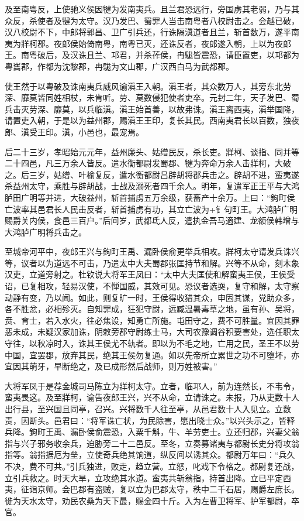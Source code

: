 \documentclass[12pt,UTF8]{ctexbook}
\begin{document}
及至南粤反，上使驰义侯因犍为发南夷兵。且兰君恐远行，旁国虏其老弱，乃与其众反，杀使者及犍为太守。汉乃发巴、蜀罪人当击南粤者八校尉击之。会越已破，汉八校尉不下，中郎将郭昌、卫广引兵还，行诛隔滇道者且兰，斩首数万，遂平南夷为牂柯郡。夜郎侯始倚南粤，南粤已灭，还诛反者，夜郎遂入朝，上以为夜郎王。南粤破后，及汉诛且兰、邛君，并杀莋侯，冉駹皆震恐，请臣置吏，以邛都为粤巂郡，作都为沈黎郡，冉駹为文山郡，广汉西白马为武都郡。



使王然于以粤破及诛南夷兵威风谕滇王入朝。滇王者，其众数万人，其旁东北劳深、靡莫皆同姓相杖，未肯听。劳、莫数侵犯使者吏卒。元封二年，天子发巴、蜀兵击灭劳深、靡莫，以兵临滇。滇王始首善，以故弗诛。滇王离西夷，滇举国降，请置吏入朝，于是以为益州郡，赐滇王王印，复长其民。西南夷君长以百数，独夜郎、滇受王印。滇，小邑也，最宠焉。



后二十三岁，孝昭始元元年，益州廉头、姑缯民反，杀长吏。牂柯、谈指、同并等二十四邑，凡三万余人皆反。遣水衡都尉发蜀郡、犍为奔命万余人击牂柯，大破之。后三岁，姑缯、叶榆复反，遣水衡都尉吕辟胡将郡兵击之。辟胡不进，蛮夷遂杀益州太守，乘胜与辟胡战，士战及溺死者四千余人。明年，复遣军正王平与大鸿胪田广明等并进，大破益州，斩首捕虏五万余级，获畜产十余万。上曰：“鉤町侯亡波率其邑君长人民击反者，斩首捕虏有功，其立亡波为+钅句町王。大鸿胪广明赐爵关内侯，食邑三百户。”后间岁，武都氐人反，遣执金吾马適建、龙额侯韩增与大鸿胪广明将兵击之。



至城帝河平中，夜郎王兴与鉤町王禹、漏卧侯俞更举兵相攻。牂柯太守请发兵诛兴等，议者以为道远不可击，乃遣太中大夫蜀郡张匡持节和解。兴等不从命，刻木象汉吏，立道旁射之。杜钦说大将军王凤曰：“太中大夫匡使和解蛮夷王侯，王侯受诏，已复相攻，轻易汉使，不惮国威，其效可见。恐议者选耎，复守和解，太守察动静有变，乃以闻。如此，则复旷一时，王侯得收猎其众，申固其谋，党助众多，各不胜忿，必相殄灭。自知罪成，狂犯守尉，远臧温暑毒草之地，虽有孙、吴将，贲、育士，若入水火，往必焦设，知勇亡所施。屯田守之，费不可胜量。宜因其罪恶未成，未疑汉家加诛，阴敕旁郡守尉练士马，大司农豫调谷积要害处，选任职太守往，以秋凉时入，诛其王侯尤不轨者。即以为不毛之地，亡用之民，圣王不以劳中国，宜罢郡，放弃其民，绝其王侯勿复通。如以先帝所立累世之功不可堕坏，亦宜因其萌牙，早断绝之，及已成形然后战师，则万姓被害。”



大将军凤于是荐金城司马陈立为牂柯太守。立者，临邛人，前为连然长，不韦令，蛮夷畏这。及至牂柯，谕告夜郎王兴，兴不从命，立请诛之。未报，乃从吏数十人出行县，至兴国且同亭，召兴。兴将数千人往至亭，从邑君数十人入见立。立数责，因断头。邑君曰：“将军诛亡状，为民除害，愿出晓士众。”以兴头示之，皆释兵降。鉤町王禹、漏卧侯俞震恐，入粟千斛，牛、羊劳吏士。立还归郡，兴妻父翁指与兴子邪务收余兵，迫胁旁二十二邑反。至冬，立奏募诸夷与都尉长史分将攻翁指等。翁指据厄为垒，立使奇兵绝其饷道，纵反间以诱其众。都尉万年曰：“兵久不决，费不可共。”引兵独进，败走，趋立营。立怒，叱戏下令格之。都尉复还战，立引兵救之。时天大旱，立攻绝其水道。蛮夷共斩翁指，持首出降。立已平定西夷，征诣京师。会巴郡有盗贼，复以立为巴郡太守，秩中二千石居，赐爵左庶长。徙为天水太守，劝民农桑为天下最，赐金四十斤。入为左曹卫将军、护军都尉，卒官。
\end{document}
